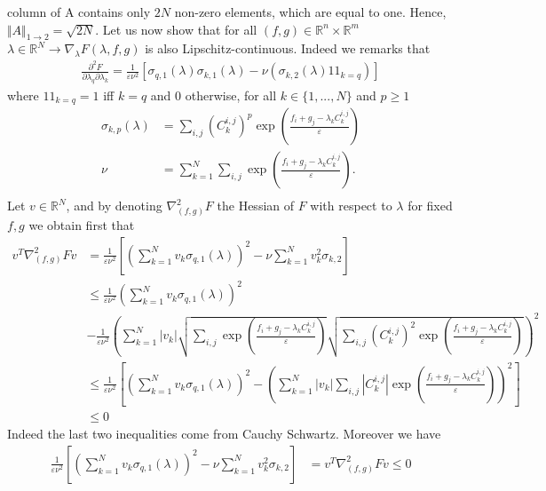 \begin{prv*}
column of A contains only $2N$ non-zero elements, which
are equal to one. Hence, $\Vert A\Vert_{1\rightarrow 2} = \sqrt{2N}$. Let us now show that for all $(f,g)\in\mathbb{R}^n\times\mathbb{R}^m $ $\lambda\in\mathbb{R}^N \rightarrow \nabla_{\lambda} F(\lambda,f,g)$ is also Lipschitz-continuous. Indeed we remarks that 
\begin{align*}
    \frac{\partial^2 F}{\partial\lambda_q\partial\lambda_k} = \frac{1}{\varepsilon\nu^2}\left[\sigma_{q,1}(\lambda)\sigma_{k,1}(\lambda) - \nu (\sigma_{k,2}(\lambda)1\!\!1_{k=q})\right]
\end{align*}
where $1\!\!1_{k=q}=1$ iff $k=q$ and 0 otherwise, for all $k\in\{1,...,N\}$ and $p\geq 1$
\begin{align*}
    \sigma_{k,p}(\lambda) &= \sum_{i,j} (C_k^{i,j})^p \exp\left(\frac{f_i + g_j-\lambda_k C_k^{i,j}}{\varepsilon}\right) \\
    \nu &= \sum_{k=1}^N \sum_{i,j} \exp\left(\frac{f_i + g_j-\lambda_k C_k^{i,j}}{\varepsilon}\right).\\
\end{align*}
Let $v\in\mathbb{R}^N$, and by denoting $\nabla^2_{(f,g)}F$ the Hessian of $F$ with respect to $\lambda$ for fixed $f,g$ we obtain first that 
\begin{align*}
  v^T \nabla^2_{(f,g)}F v &=\frac{1}{\varepsilon\nu^2} \left[ \left(\sum_{k=1}^N v_k \sigma_{q,1}(\lambda)\right)^2 -\nu \sum_{k=1}^N v_k^2 \sigma_{k,2}\right]\\
  &\leq \frac{1}{\varepsilon\nu^2}\left(\sum_{k=1}^N v_k \sigma_{q,1}(\lambda)\right)^2 \\
  &-\frac{1}{\varepsilon\nu^2} \left(\sum_{k=1}^N |v_k| \sqrt{\sum_{i,j} \exp\left(\frac{f_i + g_j-\lambda_k C_k^{i,j}}{\varepsilon}\right)}  \sqrt{\sum_{i,j} (C_k^{i,j})^2 \exp\left(\frac{f_i + g_j-\lambda_k C_k^{i,j}}{\varepsilon}\right)} \right)^2 \\
  &\leq \frac{1}{\varepsilon\nu^2}\left[\left(\sum_{k=1}^N v_k \sigma_{q,1}(\lambda)\right)^2- \left(\sum_{k=1}^N |v_k| \sum_{i,j}  |C_k^{i,j}| \exp\left(\frac{f_i + g_j-\lambda_k C_k^{i,j}}{\varepsilon}\right)\right)^2\right]\\
  &\leq 0
 \end{align*}
Indeed the last two inequalities come from Cauchy Schwartz. Moreover we have
\begin{align*}
 \frac{1}{\varepsilon\nu^2} \left[ \left(\sum_{k=1}^N v_k \sigma_{q,1}(\lambda)\right)^2 -\nu \sum_{k=1}^N v_k^2 \sigma_{k,2}\right] & = v^T \nabla^2_{(f,g)}F v \leq 0   \\

\end{align*}
\end{prv*}
